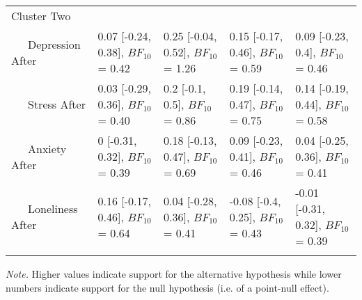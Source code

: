 \documentclass[
  english,
  jou,floatsintext]{apa6}
\begin{document}
\begin{table*}[tbp]
\begin{center}
\begin{threeparttable}
\begin{tabular}{lllll}
Cluster Two &  &  &  & \\
\ \ \ Depression After & \makecell[c]{0.07 [-0.24, 0.38], \\$BF_{10}$ = 0.42} & \makecell[c]{0.25 [-0.04, 0.52], \\$BF_{10}$ = 1.26} & \makecell[c]{0.15 [-0.17, 0.46], \\$BF_{10}$ = 0.59} & \makecell[c]{0.09 [-0.23, 0.4], \\$BF_{10}$ = 0.46}\\
\ \ \ Stress After & \makecell[c]{0.03 [-0.29, 0.36], \\$BF_{10}$ = 0.40} & \makecell[c]{0.2 [-0.1, 0.5], \\$BF_{10}$ = 0.86} & \makecell[c]{0.19 [-0.14, 0.47], \\$BF_{10}$ = 0.75} & \makecell[c]{0.14 [-0.19, 0.44], \\$BF_{10}$ = 0.58}\\
\ \ \ Anxiety After & \makecell[c]{0 [-0.31, 0.32], \\$BF_{10}$ = 0.39} & \makecell[c]{0.18 [-0.13, 0.47], \\$BF_{10}$ = 0.69} & \makecell[c]{0.09 [-0.23, 0.41], \\$BF_{10}$ = 0.46} & \makecell[c]{0.04 [-0.25, 0.36], \\$BF_{10}$ = 0.41}\\
\ \ \ Loneliness After & \makecell[c]{0.16 [-0.17, 0.46], \\$BF_{10}$ = 0.64} & \makecell[c]{0.04 [-0.28, 0.36], \\$BF_{10}$ = 0.41} & \makecell[c]{-0.08 [-0.4, 0.25], \\$BF_{10}$ = 0.43} & \makecell[c]{-0.01 [-0.31, 0.32], \\$BF_{10}$ = 0.39}\\
\bottomrule
\addlinespace
\end{tabular}

\begin{tablenotes}[para]
\normalsize{\textit{Note.} Higher values indicate support for the alternative hypothesis while lower numbers indicate support for the null hypothesis (i.e. of a point-null effect).}
\end{tablenotes}

\end{threeparttable}
\end{center}

\end{table*}
\end{document}
